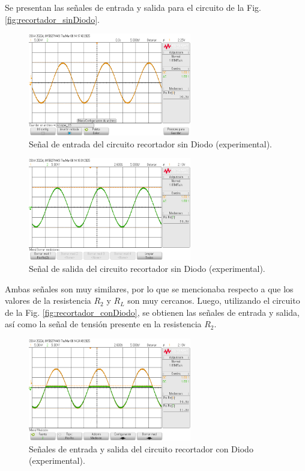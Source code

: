 \documentclass[journal]{IEEEtran}
\begin{document}
Se presentan las señales de entrada y salida para el circuito de la Fig. \ref{fig:recortador_sinDiodo}.
\begin{figure}[H]
        \centering
        \includegraphics[width=2.8in]{SignalExperimental_01.png}
        \caption{Señal de entrada del circuito recortador sin Diodo (experimental).}
        \label{fig:SignalExperimental_01}
\end{figure}
\begin{figure}[H]
        \centering
        \includegraphics[width=2.8in]{SignalExperimental_02.png}
        \caption{Señal de salida del circuito recortador sin Diodo (experimental).}
        \label{fig:SignalExperimental_02}
\end{figure}

Ambas señales son muy similares, por lo que se mencionaba respecto a que los valores de la resistencia $R_2$ y $R_L$ son muy cercanos. Luego,
utilizando el circuito de la Fig. \ref{fig:recortador_conDiodo}, se obtienen las señales de entrada y salida, así como la señal de tensión presente en la resistencia $R_2$.

\begin{figure}[H]
        \centering
        \includegraphics[width=2.8in]{SignalExperimental_03.png}
        \caption{Señales de entrada y salida del circuito recortador con Diodo (experimental).}
        \label{fig:SignalExperimental_03}
\end{figure}
\end{document}
